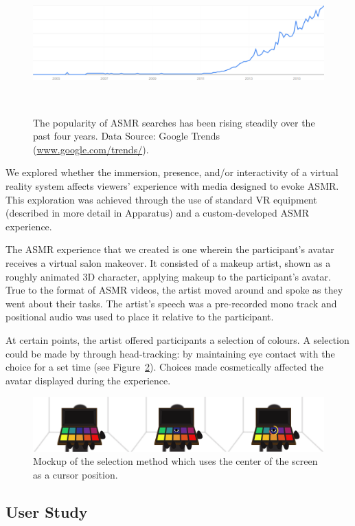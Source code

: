 \documentclass{sigchi}
\begin{document}
\begin{figure}[htb]
\centering
  \includegraphics[width=0.9\columnwidth]{figures/google-trends}
  \caption{The popularity of ASMR searches has been rising steadily over the past four years. Data Source: Google Trends (\url{www.google.com/trends/}).}~\label{fig:google-trends}
\end{figure}

We explored whether the immersion, presence, and/or interactivity of a virtual reality system affects viewers' experience with media designed to evoke ASMR. This exploration was achieved through the use of standard VR equipment (described in more detail in Apparatus) and a custom-developed ASMR experience.

The ASMR experience that we created is one wherein the participant's avatar receives a virtual salon makeover. It consisted of a makeup artist, shown as a roughly animated 3D character, applying makeup to the participant's avatar. True to the format of ASMR videos, the artist moved around and spoke as they went about their tasks. The artist's speech was a pre-recorded mono track and positional audio was used to place it relative to the participant.

At certain points, the artist offered participants a selection of colours. A selection could be made by through head-tracking: by maintaining eye contact with the choice for a set time (see
Figure~\ref{fig:selection}). Choices made cosmetically affected the avatar displayed during the experience.

\begin{figure}[htb]
\centering
  \includegraphics[width=0.9\columnwidth]{figures/selection}
  \caption{Mockup of the selection method which uses the center of the screen as a cursor position.}
  \label{fig:selection}
\end{figure}

\subsection{User Study}
\end{document}
